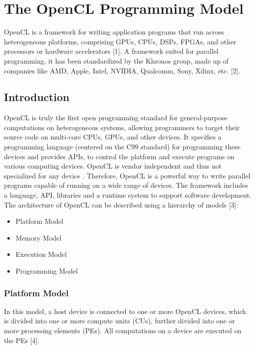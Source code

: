 \chapter{The OpenCL Programming Model}
\label{ch4_opencl}

OpenCL is a framework for writing application programs that run across heterogeneous platforms, comprising GPUs, CPUs, DSPs, FPGAs, and other processors or hardware accelerators [1]. A framework suited for parallel programming, it has been standardized by the Khronos group, made up of companies like AMD, Apple, Intel, NVIDIA, Qualcomm, Sony, Xilinx, etc. [2].

\section{Introduction}

OpenCL is truly the first open programming standard for general-purpose computations on heterogeneous systems, allowing programmers to target their source code on multi-core CPUs, GPUs, and other devices. It specifies a programming language (centered on the C99 standard) for programming these devices and provides APIs, to control the platform and execute programs on various computing devices. OpenCL is vendor independent and thus not specialized for any device . Therefore, OpenCL is a powerful way to write parallel programs capable of running on a wide range of devices. \newline\newline
The framework includes a language, API, libraries and a runtime system to support software development. The architecture of OpenCL can be described using a hierarchy of models [3]:

\begin{itemize}
\item Platform Model
\item Memory Model
\item Execution Model
\item Programming Model
\end{itemize}

\subsection{Platform Model}
In this model, a host device is connected to one or more OpenCL devices, which is divided into one or more compute units (CUs), further divided into one or more processing elements (PEs). All computations on a device are executed on the PEs [4].

